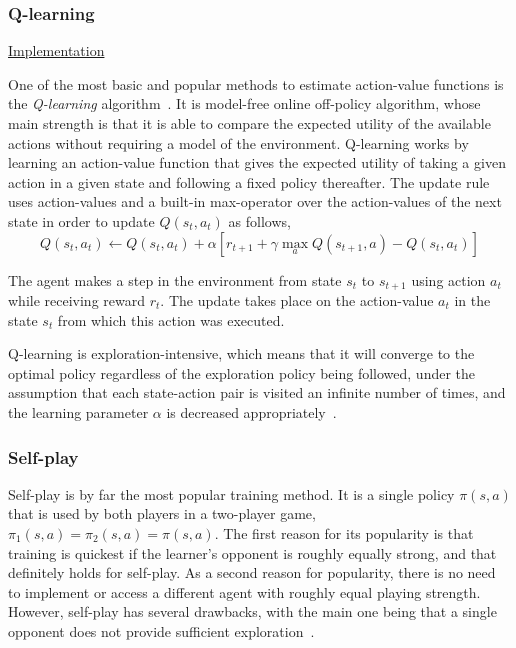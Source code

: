 \documentclass{article}
\begin{document}

\subsubsection{Q-learning}

\noindent \href{https://github.com/davidrobles/mlnd-capstone-code/blob/master/capstone/algorithms/qlearning.py}
     {Implementation}
\break

One of the most basic and popular methods to estimate action-value functions is the
\emph{Q-learning} algorithm~\citep{Watkins1989PhD}. It is model-free online off-policy algorithm,
whose main strength is that it is able to compare the expected utility of the available actions
without requiring a model of the environment. Q-learning works by learning an action-value function
that gives the expected utility of taking a given action in a given state and following a fixed
policy thereafter. The update rule uses action-values and a built-in max-operator over the
action-values of the next state in order to update $Q(s_t, a_t)$ as follows,
%
\begin{equation}
    Q(s_t, a_t) \gets Q(s_t, a_t) + \alpha [r_{t+1} + \gamma \max_a Q(s_{t+1}, a) - Q(s_t, a_t)]
\end{equation}

The agent makes a step in the environment from state $s_t$ to $s_{t+1}$ using action $a_t$ while
receiving reward $r_t$. The update takes place on the action-value $a_t$ in the state $s_t$ from
which this action was executed.

Q-learning is exploration-intensive, which means that it will converge to the optimal policy
regardless of the exploration policy being followed, under the assumption that each state-action
pair is visited an infinite number of times, and the learning parameter $\alpha$ is decreased
appropriately~\citep{Watkins1992Q}.

\subsubsection{Self-play}

Self-play is by far the most popular training method. It is a single policy $\pi(s,a)$ that is used
by both players in a two-player game, $\pi_1(s,a) = \pi_2(s,a) = \pi(s,a)$. The first reason for its
popularity is that training is quickest if the learner's opponent is roughly equally strong, and
that definitely holds for self-play. As a second reason for popularity, there is no need to
implement or access a different agent with roughly equal playing strength. However, self-play has
several drawbacks, with the main one being that a single opponent does not provide sufficient
exploration~\citep{Szita2011RLGames}.
\end{document}
